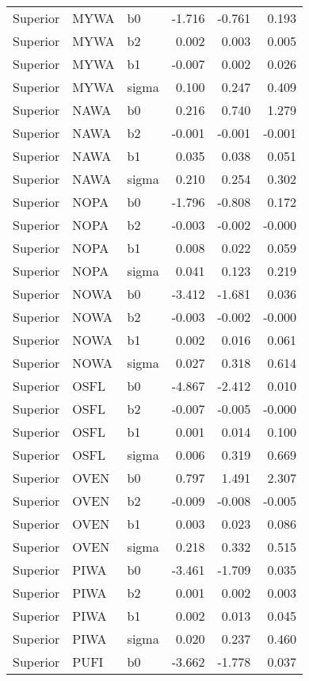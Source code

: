 \begin{table}[ht]
\begin{center}
\begin{tabular}{lllrrr}
  Superior & MYWA & b0 & -1.716 & -0.761 & 0.193 \\ 
  Superior & MYWA & b2 & 0.002 & 0.003 & 0.005 \\ 
  Superior & MYWA & b1 & -0.007 & 0.002 & 0.026 \\ 
  Superior & MYWA & sigma & 0.100 & 0.247 & 0.409 \\ 
  Superior & NAWA & b0 & 0.216 & 0.740 & 1.279 \\ 
  Superior & NAWA & b2 & -0.001 & -0.001 & -0.001 \\ 
  Superior & NAWA & b1 & 0.035 & 0.038 & 0.051 \\ 
  Superior & NAWA & sigma & 0.210 & 0.254 & 0.302 \\ 
  Superior & NOPA & b0 & -1.796 & -0.808 & 0.172 \\ 
  Superior & NOPA & b2 & -0.003 & -0.002 & -0.000 \\ 
  Superior & NOPA & b1 & 0.008 & 0.022 & 0.059 \\ 
  Superior & NOPA & sigma & 0.041 & 0.123 & 0.219 \\ 
  Superior & NOWA & b0 & -3.412 & -1.681 & 0.036 \\ 
  Superior & NOWA & b2 & -0.003 & -0.002 & -0.000 \\ 
  Superior & NOWA & b1 & 0.002 & 0.016 & 0.061 \\ 
  Superior & NOWA & sigma & 0.027 & 0.318 & 0.614 \\ 
  Superior & OSFL & b0 & -4.867 & -2.412 & 0.010 \\ 
  Superior & OSFL & b2 & -0.007 & -0.005 & -0.000 \\ 
  Superior & OSFL & b1 & 0.001 & 0.014 & 0.100 \\ 
  Superior & OSFL & sigma & 0.006 & 0.319 & 0.669 \\ 
  Superior & OVEN & b0 & 0.797 & 1.491 & 2.307 \\ 
  Superior & OVEN & b2 & -0.009 & -0.008 & -0.005 \\ 
  Superior & OVEN & b1 & 0.003 & 0.023 & 0.086 \\ 
  Superior & OVEN & sigma & 0.218 & 0.332 & 0.515 \\ 
  Superior & PIWA & b0 & -3.461 & -1.709 & 0.035 \\ 
  Superior & PIWA & b2 & 0.001 & 0.002 & 0.003 \\ 
  Superior & PIWA & b1 & 0.002 & 0.013 & 0.045 \\ 
  Superior & PIWA & sigma & 0.020 & 0.237 & 0.460 \\ 
  Superior & PUFI & b0 & -3.662 & -1.778 & 0.037 \\ 

\end{tabular}
\end{center}
\end{table}
